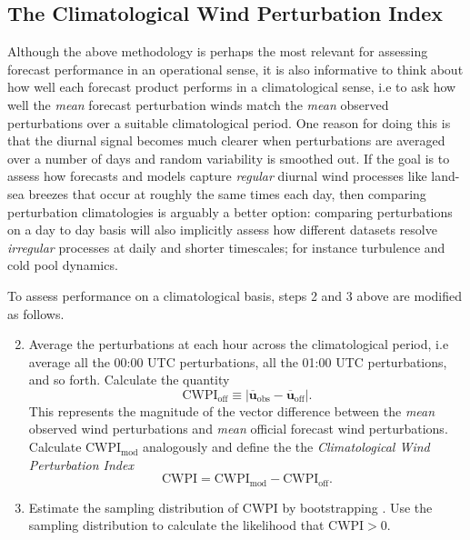 \documentclass[10pt]{article}
\begin{document}
\subsection{The Climatological Wind Perturbation Index}\label{climatological-performance}
Although the above methodology is perhaps the most relevant for assessing forecast performance in an operational sense, it is also informative to think about how well each forecast product performs in a
climatological sense, i.e to ask how well the \emph{mean} forecast perturbation winds match the \emph{mean} observed perturbations over a suitable climatological period. One reason for doing this is that the diurnal signal becomes much clearer when perturbations are averaged over a number of days and random variability is smoothed out. If the goal is to assess how forecasts and models capture \emph{regular} diurnal wind processes like land-sea breezes that occur at roughly the same times each day, then comparing perturbation climatologies is arguably a better option: comparing perturbations on a day to day basis will also implicitly assess how different datasets resolve \emph{irregular} processes at daily and shorter timescales; for instance turbulence and cold pool dynamics.

To assess performance on a climatological basis, steps 2 and 3 above are modified as follows. 
\begin{enumerate}
\setcounter{enumi}{1}
\item
Average the perturbations at each hour across the climatological period, i.e average all the 00:00 UTC perturbations, all the 01:00 UTC perturbations, and so forth. Calculate the quantity
\begin{equation}
\text{CWPI}_{\text{off}} \equiv \left\lvert \overline{\boldsymbol{u}}_{\text{obs}}-\overline{\boldsymbol{u}}_{\text{off}} \right\rvert.
\end{equation}
This represents the magnitude of the vector difference between the \emph{mean} 
observed wind perturbations and \emph{mean} official forecast wind perturbations. Calculate \(\text{CWPI}_{\text{mod}}\) analogously and define the the \emph{Climatological Wind Perturbation Index}
\begin{equation}
\text{CWPI} = \text{CWPI}_{\text{mod}} - \text{CWPI}_{\text{off}}.
\end{equation}
\item
Estimate the sampling distribution of \(\text{CWPI}\) by bootstrapping
\citep{efron79}. Use the sampling distribution to calculate the likelihood that $\text{CWPI} > 0$.  
\end{enumerate}
\end{document}
